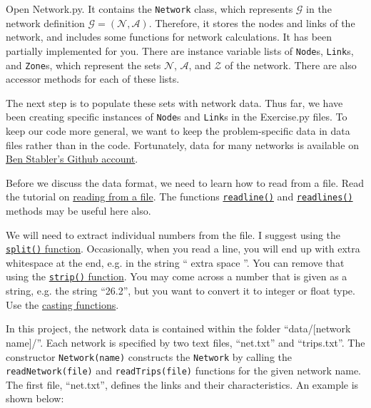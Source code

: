 \documentclass[11pt]{article}
\newcommand{\N}{\mathcal{N}}
\newcommand{\A}{\mathcal{A}}
\newcommand{\Z}{\mathcal{Z}}
\begin{document}
Open Network.py. It contains the \texttt{Network} class, which represents $\mathcal{G}$ in the network definition $\mathcal{G}=(\N, \A)$. Therefore, it stores the nodes and links of the network, and includes some functions for network calculations.
%
It has been partially implemented for you. There are instance variable lists of \texttt{Node}s, \texttt{Link}s, and \texttt{Zone}s, which represent the sets $\N$, $\A$, and $\Z$ of the network. There are also accessor methods for each of these lists. 

The next step is to populate these sets with network data. Thus far, we have been creating specific instances of \texttt{Node}s and \texttt{Link}s in the Exercise.py files. To keep our code more general, we want to keep the problem-specific data in data files rather than in the code. Fortunately, data for many networks is available on \href{https://github.com/bstabler/TransportationNetworks}{Ben Stabler's Github account}. 


Before we discuss the data format, we need to learn how to read from a file. Read the tutorial on  \href{https://www.w3schools.com/python/python_file_open.asp}{reading from a file}. The functions \href{https://www.w3schools.com/python/ref_file_readline.asp}{\texttt{readline()}} and \href{https://www.w3schools.com/python/ref_file_readlines.asp}{\texttt{readlines()}} methods may be useful here also. 

We will need to extract individual numbers from the file. I suggest using the \href{https://www.w3schools.com/python/ref_string_split.asp}{\texttt{split()} function}. Occasionally, when you read a line, you will end up with extra whitespace at the end, e.g. in the string `` extra space ''. You can remove that using the \href{https://www.w3schools.com/python/ref_string_strip.asp}{\texttt{strip()} function}. You may come across a number that is given as a string, e.g. the string ``26.2'', but you want to convert it to integer or float type. Use the \href{https://www.w3schools.com/python/python_casting.asp}{casting functions}. 

In this project, the network data is contained within the folder ``data/[network name]/''. Each network is specified by two text files, ``net.txt'' and ``trips.txt''.  The constructor \texttt{Network(name)} constructs the \texttt{Network} by calling the \texttt{readNetwork(file)} and \texttt{readTrips(file)} functions for the given network name. 
%
The first file, ``net.txt'', defines the links and their characteristics. An example is shown below:
\end{document}
